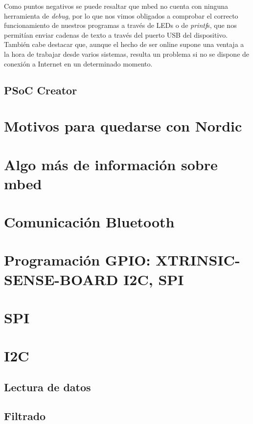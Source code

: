 Como puntos negativos se puede resaltar que mbed no cuenta con ninguna herramienta de \textit{debug}, por lo que nos vimos obligados a comprobar el correcto funcionamiento de nuestros programas a través de LEDs o de \textit{printf}s, que nos permitían enviar cadenas de texto a través del puerto USB del dispositivo. También cabe destacar que, aunque el hecho de ser online supone una ventaja a la hora de trabajar desde varios sistemas, resulta un problema si no se dispone de conexión a Internet en un determinado momento.

\subsection{PSoC Creator}
\label{explicacionPSoCCreator}

\section{Motivos para quedarse con Nordic}
\label{makereference4.3}

\section{Algo más de información sobre mbed}
\label{makereference4.4}

\section{Comunicación Bluetooth}
\label{makereference4.5}

\section{Programación GPIO: XTRINSIC-SENSE-BOARD I2C, SPI}
\label{makereference4.6}

\section{SPI}
\label{makereference4.7}

\section{I2C}
\label{makereference4.8}

\subsection{Lectura de datos}
\label{makereference4.8.1}

\subsection{Filtrado}
\label{makereference4.8.2}